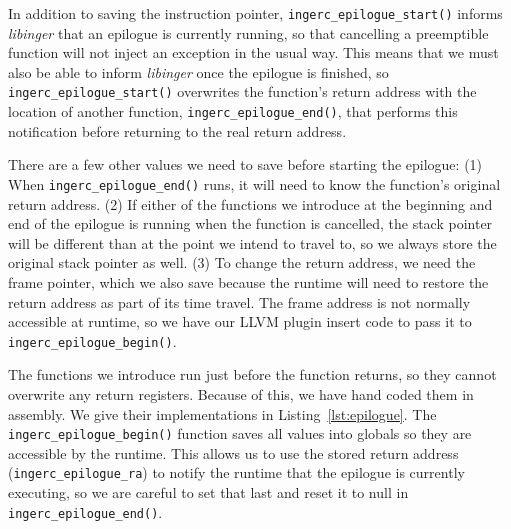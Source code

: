 In addition to saving the instruction pointer, \texttt{ingerc\_epilogue\_start()}
informs \textit{libinger} that an epilogue is currently running, so that cancelling a
preemptible function will not inject an exception in the usual way.  This means that
we must also be able to inform \textit{libinger} once the epilogue is finished, so
\texttt{ingerc\_epilogue\_start()} overwrites the function's return address with the
location of another function, \texttt{ingerc\_epilogue\_end()}, that performs this
notification before returning to the real return address.

\begin{sloppypar}
There are a few other values we need to save before starting the epilogue:  (1) When
\texttt{ingerc\_epilogue\_end()} runs, it will need to know the function's original
return address.  (2) If either of the functions we introduce at the beginning and end
of the epilogue is running when the function is cancelled, the stack pointer will be
different than at the point we intend to travel to, so we always store the original
stack pointer as well.  (3) To change the return address, we need the frame pointer,
which we also save because the runtime will need to restore the return address as
part of its time travel.  The frame address is not normally accessible at runtime, so
we have our LLVM plugin insert code to pass it to \texttt{ingerc\_epilogue\_begin()}.
\end{sloppypar}

The functions we introduce run just before the function returns, so they cannot
overwrite any return registers.  Because of this, we have hand coded them in
assembly.  We give their implementations in Listing~\ref{lst:epilogue}.  The
\texttt{ingerc\_epilogue\_begin()} function saves all values into globals so they are
accessible by the runtime.  This allows us to use the stored return address
(\texttt{ingerc\_epilogue\_ra}) to notify the runtime that the epilogue is currently
executing, so we are careful to set that last and reset it to null in
\texttt{ingerc\_epilogue\_end()}.

